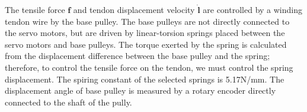\documentclass{llncs}
\begin{document}
The tensile force $\bm{f}$ and tendon displacement velocity $\dot{\bm{l}}$ are controlled by a winding tendon wire by the base pulley.
The base pulleys are not directly connected to the servo motors, but are driven by linear-torsion springs placed between the servo motors and base pulleys.
The torque exerted by the spring
is calculated from
the displacement difference between the base pulley and the spring;
therefore, to control the tensile force on the tendon, we must control the spring displacement.
The spiring constant of the selected springs is
5.17N/mm.
The displacement angle of base pulley is measured by a rotary encoder directly connected to the shaft of the pully.

\end{document}
